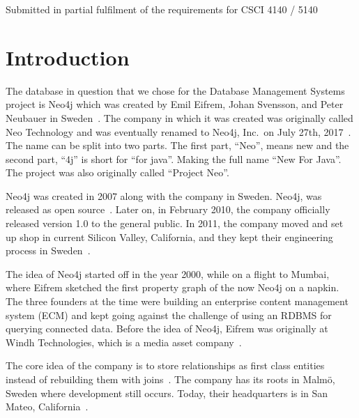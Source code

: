 \documentclass[11pt,a4paper]{article}
\begin{document}
\begin{titlepage}
\vspace{1.2cm}

{\small Submitted in partial fulfilment of the requirements for CSCI 4140 / 5140 \par}

\vspace{0.5cm}

\end{titlepage}

\clearpage
{}
\tableofcontents
\clearpage
\listoftables
\clearpage
\lstlistoflistings
\clearpage
{}

\section{Introduction}

The database in question that we chose for the Database Management Systems project is Neo4j which was created by Emil Eifrem, Johan Svensson, and Peter Neubauer in Sweden~\cite{wikipedia2026neo4j}. The company in which it was created was originally called Neo Technology and was eventually renamed to Neo4j, Inc.\ on July 27th, 2017~\cite{eifrem2017helloworld}. The name can be split into two parts. The first part, ``Neo'', means new and the second part, ``4j'' is short for ``for java''. Making the full name ``New For Java''. The project was also originally called ``Project Neo''.

Neo4j was created in 2007 along with the company in Sweden. Neo4j, was released as open source~\cite{wikipedia2026neo4j,dbdb2026neo4j}. Later on, in February 2010, the company officially released version 1.0 to the general public. In 2011, the company moved and set up shop in current Silicon Valley, California, and they kept their engineering process in Sweden~\cite{wikipedia2026neo4j,dbdb2026neo4j}.

The idea of Neo4j started off in the year 2000, while on a flight to Mumbai, where Eifrem sketched the first property graph of the now Neo4j on a napkin. The three founders at the time were building an enterprise content management system (ECM) and kept going against the challenge of using an RDBMS for querying connected data. Before the idea of Neo4j, Eifrem was originally at Windh Technologies, which is a media asset company~\cite{baer2019eifrem}.

The core idea of the company is to store relationships as first class entities instead of rebuilding them with joins~\cite{dbdb2026neo4j}. The company has its roots in Malmö, Sweden where development still occurs. Today, their headquarters is in San Mateo, California~\cite{oresund2016neo}.
\end{document}
